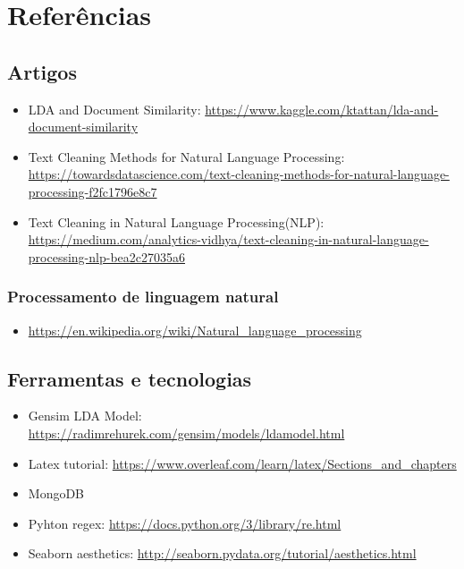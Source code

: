 \section{Referências}

\subsection{Artigos}

\begin{itemize}
    \item LDA and Document Similarity: \url{https://www.kaggle.com/ktattan/lda-and-document-similarity}
    \item Text Cleaning Methods for Natural Language Processing: \url{https://towardsdatascience.com/text-cleaning-methods-for-natural-language-processing-f2fc1796e8c7}
    \item Text Cleaning in Natural Language Processing(NLP): \url{https://medium.com/analytics-vidhya/text-cleaning-in-natural-language-processing-nlp-bea2c27035a6}
\end{itemize}

\subsubsection{Processamento de linguagem natural}

\begin{itemize}
    \item \url{https://en.wikipedia.org/wiki/Natural_language_processing}
\end{itemize}

\subsection{Ferramentas e tecnologias}

\begin{itemize}
    \item Gensim LDA Model: \url{https://radimrehurek.com/gensim/models/ldamodel.html}
    \item Latex tutorial: \url{https://www.overleaf.com/learn/latex/Sections\_and\_chapters}
    \item MongoDB
    \item Pyhton regex: \url{https://docs.python.org/3/library/re.html}
    \item Seaborn aesthetics: \url{http://seaborn.pydata.org/tutorial/aesthetics.html}
\end{itemize}